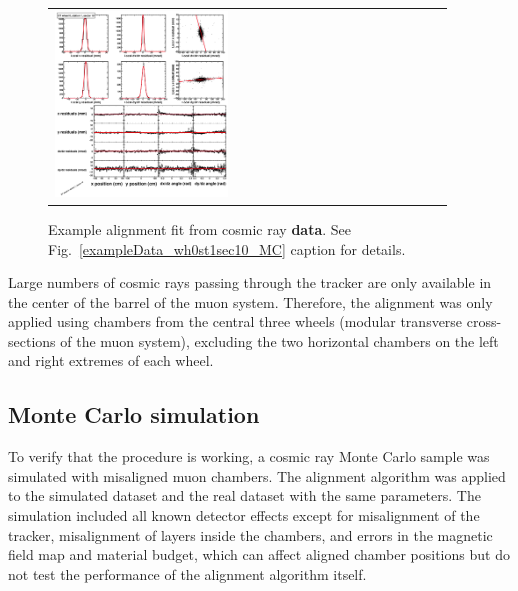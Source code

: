 \begin{figure}[p]
\begin{tabular}{p{0.47\linewidth} c p{0.47\linewidth}}
\includegraphics[width=\linewidth]{exampleData_wh0st1sec10_after.eps}
\end{tabular}
\caption{Example alignment fit from cosmic ray {\bf data}.  See Fig.~\ref{exampleData_wh0st1sec10_MC} caption for details. \label{exampleData_wh0st1sec10}}
\end{figure}

Large numbers of cosmic rays passing through the tracker are only
available in the center of the barrel of the muon system.  Therefore,
the alignment was only applied using chambers from the central three
wheels (modular transverse cross-sections of the muon system),
excluding the two horizontal chambers on the left and right extremes
of each wheel.

\subsection{Monte Carlo simulation}

To verify that the procedure is working, a cosmic ray Monte Carlo
sample was simulated with misaligned muon chambers.  The alignment
algorithm was applied to the simulated dataset and the real dataset
with the same parameters.  The simulation included all known detector
effects except for misalignment of the tracker, misalignment of layers
inside the chambers, and errors in the magnetic field map and material
budget, which can affect aligned chamber positions but do not test the
performance of the alignment algorithm itself.

